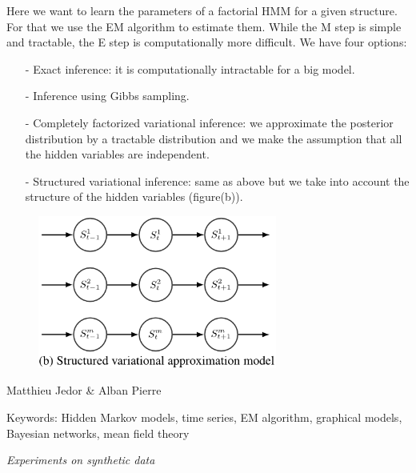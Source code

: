 \documentclass[10pt,a4paper]{report}
\begin{document}
\Large{

Here we want to learn the parameters of a factorial HMM for a given structure. For that we use the EM algorithm to estimate them. While the M step is simple and tractable, the E step is computationally more difficult. We have four options:

\begin{itemize}
	\item[-]Exact inference: it is computationally intractable for a big model.
	\item[-]Inference using Gibbs sampling.
	\item[-]Completely factorized variational inference: we approximate the posterior distribution by a tractable distribution and we make the assumption that all the hidden variables are independent.
	\item[-]Structured variational inference: same as above but we take into account the structure of the hidden variables (figure(b)).
\end{itemize}
\vspace{20pt}
}

\begin{figure}[h]
	\centering
	\includegraphics[width=0.7\textwidth]{sva.png}
	\label{fig:b}
\end{figure}








\newpage
\begin{center}
\end{center}
\vspace{5pt}
\begin{center}
	\LARGE{Matthieu Jedor \& Alban Pierre}
	\vspace{15pt}
	
	\Large{Keywords: Hidden Markov models, time series, EM algorithm, graphical models, Bayesian networks, mean field
theory}
\end{center}
\vspace{30pt}
\begin{center}
\Huge{\textit{Experiments on synthetic data}}
\end{center}
\vspace{20pt}
	
\end{document}

